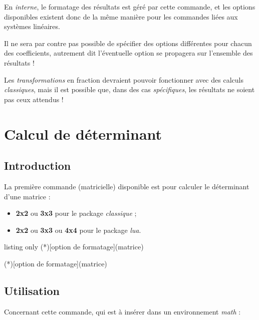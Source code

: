\documentclass[a4paper,11pt]{article}
\begin{document}
En \textit{interne}, le formatage des résultats est géré par cette commande, et les options disponibles existent donc de la même manière pour les commandes liées aux systèmes linéaires.

\smallskip

Il ne sera par contre pas possible de spécifier des options différentes pour chacun des coefficients, autrement dit l'éventuelle option se propagera sur l'ensemble des résultats !

\smallskip

Les \textit{transformations} en fraction devraient pouvoir fonctionner avec des calculs \textit{classiques}, mais il est possible que, dans des cas \textit{spécifiques}, les résultats ne soient pas ceux attendus !

\pagebreak

\section{Calcul de déterminant}

\subsection{Introduction}

La première commande (matricielle) disponible est pour calculer le déterminant d'une matrice :

\begin{itemize}
	\item \textbf{2x2} ou \textbf{3x3} pour le package \textit{classique} ;
	\item \textbf{2x2} ou \textbf{3x3} ou \textbf{4x4} pour le package \textit{lua}.
\end{itemize}

\begin{PresentationCode}{listing only}
\DetMatrice(*)[option de formatage](matrice)

\DetMatriceLUA(*)[option de formatage](matrice)
\end{PresentationCode}

\subsection{Utilisation}

Concernant cette commande, qui est à insérer dans un environnement \textit{math} :
\end{document}
